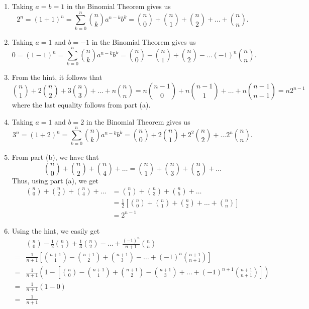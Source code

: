 \begin{solution}
    \begin{enumerate}
        \item Taking $a = b = 1$ in the Binomial Theorem gives us
        $$2^n = (1 + 1)^n = \sum_{k=0}^{n}\binom{n}{k}a^{n-k}b^k = \binom{n}{0} + \binom{n }{1} + \binom{n }{2} + \dots + \binom{n }{n }.$$
        \item Taking $a = 1$ and $b = -1$ in the Binomial Theorem gives us
        $$0 = (1 - 1)^n = \sum_{k=0}^{n}\binom{n}{k}a^{n-k}b^k = \binom{n}{0} - \binom{n }{1} + \binom{n }{2} - \dots (-1)^n \binom{n }{n }.$$
        \item From the hint, it follows that
        $$ \binom{n}{1} + 2\binom{n }{2} + 3\binom{n }{3} + \dots + n\binom{n }{n } = n\binom{n-1}{0} + n\binom{n-1}{1} + \dots + n\binom{n-1}{n-1} = n2^{n-1}$$
        where the last equality follows from part (a).
        \item Taking $a = 1$ and $b = 2$ in the Binomial Theorem gives us
        $$3^n = (1 + 2)^n = \sum_{k=0}^{n}\binom{n}{k}a^{n-k}b^k = \binom{n}{0} + 2\binom{n }{1} + 2^2\binom{n }{2} + \dots 2^n \binom{n }{n }.$$
        \item From part (b), we have that 
        $$\binom{n }{0} + \binom{n }{2} + \binom{n }{4} + \dots = \binom{n }{1} + \binom{n }{3} + \binom{n }{5} + \dots$$
        Thus, using part (a), we get
        \begin{align*}
            \binom{n }{0} + \binom{n }{2} + \binom{n }{4} + \dots &= \binom{n }{1} + \binom{n }{3} + \binom{n }{5} + \dots \\
            &= \frac{1}{2}\left[\binom{n }{0} + \binom{n }{1} + \binom{n }{2} + \dots + \binom{n }{n }\right] \\
            &= 2^{n-1}
        \end{align*}
        \item Using the hint, we easily get 
        \begin{align*}
            & \binom{n}{0} - \frac{1}{2}\binom{n }{1} + \frac{1}{3}\binom{n }{2} - \dots + \frac{(-1)^n}{n+1}\binom{n }{n } \\
            =& \frac{1}{n+1} \left[\binom{n+1}{1} - \binom{n+1}{2} + \binom{n+1}{3} - \dots + (-1)^n\binom{n+1}{n+1}\right] \\
            =& \frac{1}{n+1} \left(1 - \left[\binom{n }{0} - \binom{n+1}{1} + \binom{n+1}{2} - \binom{n+1}{3} + \dots + (-1)^{n+1}\binom{n+1}{n+1}\right]\right) \\
            =& \frac{1}{n+1}(1 - 0) \\
            =& \frac{1}{n+1}
        \end{align*}
    \end{enumerate}
\end{solution}

